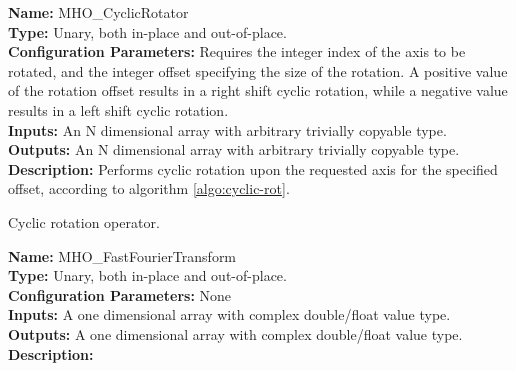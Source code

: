 \noindent \textbf{Name:} MHO\_CyclicRotator \\
\textbf{Type:} Unary, both in-place and out-of-place. \\
\textbf{Configuration Parameters:} Requires the integer index of the axis to be rotated, and the integer offset specifying the size of the rotation. A positive value of the rotation offset results in a right shift cyclic rotation, while a negative value results in a left shift cyclic rotation.\\
\textbf{Inputs:} An N dimensional array with arbitrary trivially copyable type. \\
\textbf{Outputs:} An N dimensional array with arbitrary trivially copyable type. \\
\textbf{Description:} Performs cyclic rotation upon the requested axis for the specified offset, according to algorithm \ref{algo:cyclic-rot}.

\begin{algorithm}[h!]
  \caption{Cyclic rotation operator.}
    \begin{algorithmic}[1]
    \end{algorithmic}
  \label{algo:cyclic-rot}
\end{algorithm}



\noindent \textbf{Name:} MHO\_FastFourierTransform \\
\textbf{Type:} Unary, both in-place and out-of-place. \\
\textbf{Configuration Parameters:} None\\
\textbf{Inputs:} A one dimensional array with complex double/float value type. \\
\textbf{Outputs:} A one dimensional array with complex double/float value type. \\
\textbf{Description:} \\



